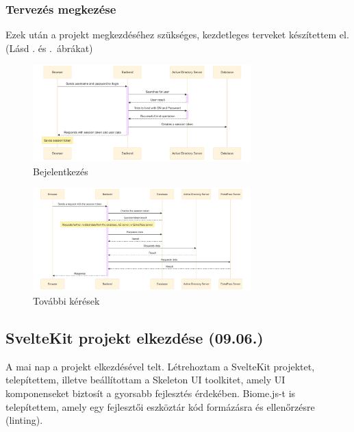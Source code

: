 \documentclass[a4paper]{article}
\begin{document}
\subsubsection*{Tervezés megkezése}
Ezek után a projekt megkezdéséhez szükséges, kezdetleges terveket készítettem el.
(Lásd . és .~ábrákat)

\begin{figure}[ht]
  \centering
  \includegraphics[angle=90,width = 0.75\textwidth]{images/login_diagram.png}
  \caption{Bejelentkezés}
  \label{fig:login_diagram}
\end{figure}
\begin{center}
\end{center}

\begin{figure}[ht]
  \centering
  \includegraphics[angle=90,width = 0.75\textwidth]{images/further_requests_diagram.png}
  \caption{További kérések}
  \label{fig:further_requests_diagram}
\end{figure}
\begin{center}
\end{center}

\subsection{SvelteKit projekt elkezdése (09.06.)}

A mai nap a projekt elkezdésével telt. Létrehoztam a SvelteKit projektet, telepítettem, illetve
beállítottam a Skeleton UI toolkitet, amely UI komponenseket biztosít a gyorsabb fejlesztés
érdekében. Biome.js-t is telepítettem, amely egy fejlesztői eszköztár kód formázásra és ellenőrzésre
(linting).\\
\end{document}
